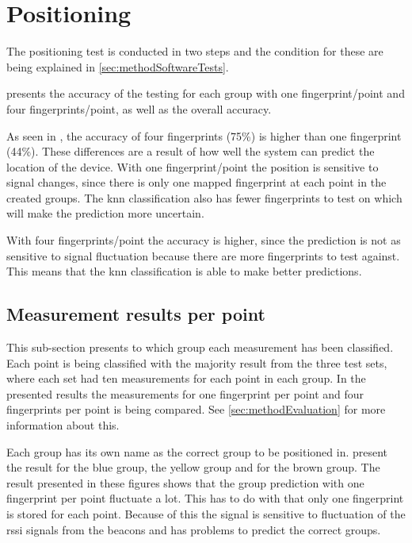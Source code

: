 \section{Positioning}\label{sec:resultPos}
The positioning test is conducted in two steps and the condition for these are being explained in \cref{sec:methodSoftwareTests}.

\bigskip

 presents the accuracy of the testing for each group with one fingerprint/point and four fingerprints/point, as well as the overall accuracy.


As seen in , the accuracy of four fingerprints (75\%) is higher than one fingerprint (44\%).
These differences are a result of how well the system can predict the location of the device.
With one fingerprint/point the position is sensitive to signal changes, since there is only one mapped fingerprint at each point in the created groups.
The \acrshort{knn} classification also has fewer fingerprints to test on which will make the prediction more uncertain.

\bigskip

With four fingerprints/point the accuracy is higher, since the prediction is not as sensitive to signal fluctuation because there are more fingerprints to test against.
This means that the \acrshort{knn} classification is able to make better predictions. 


\subsection{Measurement results per point}\label{sec:resultsPosOneFingerprint}
This sub-section presents to which group each measurement has been classified.
Each point is being classified with the majority result from the three test sets, where each set had ten measurements for each point in each group.
In the presented results the measurements for one fingerprint per point and four fingerprints per point is being compared.
See \cref{sec:methodEvaluation} for more information about this.

\bigskip

Each group has its own name as the correct group to be positioned in.
 present the result for the blue group,  the yellow group and  for the brown group.
The result presented in these figures shows that the group prediction with one fingerprint per point fluctuate a lot.
This has to do with that only one fingerprint is stored for each point.
Because of this the signal is sensitive to fluctuation of the \acrshort{rssi} signals from the beacons and has problems to predict the correct groups.

